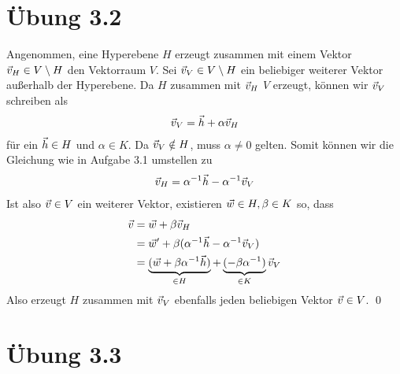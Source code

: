 \documentclass{article}
\begin{document}
\section*{Übung 3.2}
\separator

\newpar
Angenommen, eine Hyperebene $H$ erzeugt zusammen mit einem Vektor $\vec{v}_H \in V \setminus H$ den Vektorraum $V$. Sei $\vec{v}_V \in V \setminus H$ ein beliebiger weiterer Vektor außerhalb der Hyperebene. Da $H$ zusammen mit $\vec{v}_H$ $V$ erzeugt, können wir $\vec{v}_V$ schreiben als
\begin{align*}
	\vec{v}_V = \vec{h} + \alpha \vec{v}_H
\end{align*}
für ein $\vec{h} \in H$ und $\alpha \in K$. Da $\vec{v}_V \notin H$, muss $\alpha \neq 0$ gelten. Somit können wir die Gleichung wie in Aufgabe 3.1 umstellen zu
\begin{align*}
	\vec{v}_H = \alpha^{-1}\vec{h} - \alpha^{-1}\vec{v}_V
\end{align*}
Ist also $\vec{v} \in V$ ein weiterer Vektor, existieren $\vec{w} \in H, \beta \in K$ so, dass
\begin{align*}
	\vec{v} 
	&= \vec{w} + \beta \vec{v}_H\\
	&= \vec{w}' + \beta (\alpha^{-1}\vec{h} - \alpha^{-1}\vec{v}_V)\\
	&= \underbrace{(\vec{w} + \beta \alpha^{-1}\vec{h})}_{\in H} +\underbrace{(-\beta \alpha^{-1})}_{\in K}\vec{v}_V
\end{align*}
Also erzeugt $H$ zusammen mit $\vec{v}_V$ ebenfalls jeden beliebigen Vektor $\vec{v} \in V$. \qed

\section*{Übung 3.3}
\separator
\end{document}
